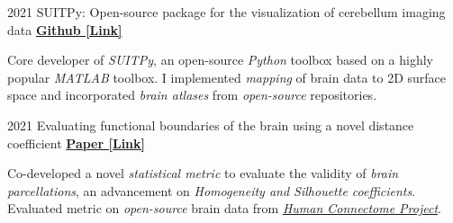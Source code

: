 

\begin{cventries}
    
  \cventry
    {2021} %
  	{SUITPy: Open-source package for the visualization of cerebellum imaging data} %
  	{\href{https://suitpy.readthedocs.io/en/latest/}{\textbf{Github [Link]}}}
  	{}
    {
      \begin{cvitems} %
      	\item {Core developer of \textit{SUITPy}, an open-source \textit{Python} toolbox based on a highly popular \textit{MATLAB} toolbox. I implemented \textit{mapping} of brain data to 2D surface space and incorporated \textit{brain atlases} from \textit{open-source} repositories.}
      \end{cvitems}
    }
    
  \cventry
    {2021} %
    {Evaluating functional boundaries of the brain using a novel distance coefficient} %
    {\href{https://www.biorxiv.org/content/10.1101/2021.05.11.443151v1.full.pdf}{\textbf{Paper [Link]}}}
    {}
    {
      \begin{cvitems} %
        \item {Co-developed a novel \textit{statistical metric} to evaluate the validity of \textit{brain parcellations}, an advancement on \textit{Homogeneity and Silhouette coefficients}. Evaluated metric on \textit{open-source} brain data from \href{http://www.humanconnectomeproject.org/}{\textit{Human Connectome Project}}.}
      \end{cvitems}
    }
    

\end{cventries}
